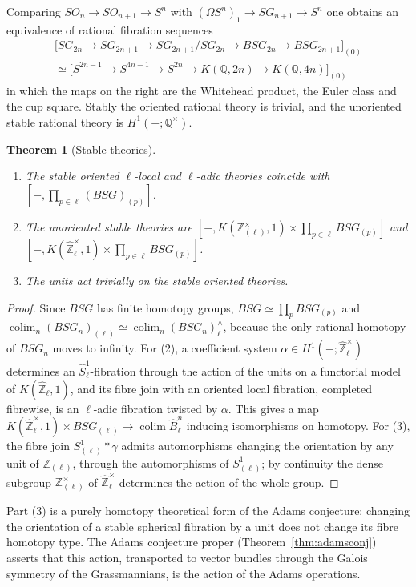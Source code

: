 \documentclass[11pt]{amsart}
\theoremstyle{plain}
\newtheorem{theorem}{Theorem}[section]
\theoremstyle{definition}
\numberwithin{equation}{section}
\newcommand{\Q}{\mathbb{Q}}
\newcommand{\Zhat}{\widehat{\mathbb{Z}}}
\newcommand{\Zl}{\mathbb{Z}_{(\ell)}}
\newcommand{\units}{^{\times}}
\DeclareMathOperator{\colim}{colim}
\begin{document}
Comparing $SO_n\to SO_{n+1}\to S^n$ with $(\Omega S^n)_1\to SG_{n+1}\to S^n$ one obtains an equivalence of rational fibration sequences
\begin{gather*}
\bigl[SG_{2n}\to SG_{2n+1}\to SG_{2n+1}/SG_{2n}\to BSG_{2n}\to BSG_{2n+1}\bigr]_{(0)}\\
\simeq\bigl[S^{2n-1}\to S^{4n-1}\to S^{2n}\to K(\Q,2n)\to K(\Q,4n)\bigr]_{(0)}
\end{gather*}
in which the maps on the right are the Whitehead product, the Euler class and the cup square.
Stably the oriented rational theory is trivial, and the unoriented stable rational theory is $H^1(-;\Q\units)$.

\begin{theorem}[Stable theories]\label{thm:stablespherical}
\begin{enumerate}[label=\textup{(\arabic*)}]
\item The stable oriented $\ell$-local and $\ell$-adic theories coincide with $[-,\prod_{p\in\ell}(BSG)_{(p)}]$.
\item The unoriented stable theories are $[-,K(\Zl\units,1)\times\prod_{p\in\ell}BSG_{(p)}]$ and $[-,K(\Zhat_\ell\units,1)\times\prod_{p\in\ell}BSG_{(p)}]$.
\item The units act trivially on the stable oriented theories.
\end{enumerate}
\end{theorem}

\begin{proof}
Since $BSG$ has finite homotopy groups, $BSG\simeq\prod_p BSG_{(p)}$ and $\colim_n(BSG_n)_{(\ell)}\simeq\colim_n(BSG_n)^\wedge_\ell$, because the only rational homotopy of $BSG_n$ moves to infinity.
For (2), a coefficient system $\alpha\in H^1(-;\Zhat_\ell\units)$ determines an $\widehat S^1_\ell$-fibration through the action of the units on a functorial model of $K(\Zhat_\ell,1)$, and its fibre join with an oriented local fibration, completed fibrewise, is an $\ell$-adic fibration twisted by $\alpha$.
This gives a map $K(\Zhat_\ell\units,1)\times BSG_{(\ell)}\to\colim\widehat B^n_\ell$ inducing isomorphisms on homotopy.
For (3), the fibre join $S^1_{(\ell)}\ast\gamma$ admits automorphisms changing the orientation by any unit of $\Zl$, through the automorphisms of $S^1_{(\ell)}$; by continuity the dense subgroup $\Zl\units$ of $\Zhat_\ell\units$ determines the action of the whole group.
\end{proof}

Part (3) is a purely homotopy theoretical form of the Adams conjecture: changing the orientation of a stable spherical fibration by a unit does not change its fibre homotopy type.
The Adams conjecture proper (Theorem~\ref{thm:adamsconj}) asserts that this action, transported to vector bundles through the Galois symmetry of the Grassmannians, is the action of the Adams operations.
\end{document}
